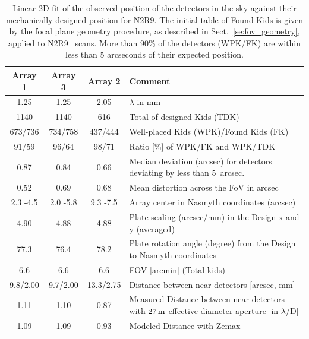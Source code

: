 \begin{table}[ht]
\label{ta:gridmatch}
\begin{center}
\begin{tabular}{|c|c|c|l|}
\hline
Array 1  &	Array 3   &	Array 2   &	Comment \\
\hline
1.25     &      1.25      &     2.05     &     $\lambda$ in mm \\
1140 	 &      1140 	   &        616  &	Total of designed Kids (TDK) \\
673/736  &	734/758  &	437/444  &	Well-placed Kids (WPK)/Found Kids (FK) \\
91/59 	 &    96/64 	 &      98/71 	 & Ratio [\%] of WPK/FK and WPK/TDK \\
0.87 	 &     0.84 	  & 0.66     &	Median deviation (arcsec) for detectors deviating by less than 5~arcsec. \\
0.52 	 &     0.69 	 &        0.68 	 & Mean distortion across the FoV in arcsec \\
2.3 -4.5  &	2.0 -5.8  &	9.3 -7.5  &	Array center in Nasmyth coordinates (arcsec) \\
4.90  &	4.88  &	4.88  &	Plate scaling (arcsec/mm) in the Design x and y (averaged) \\
77.3  &	76.4  &	78.2  &	Plate rotation angle (degree) from the Design to Nasmyth coordinates \\
6.6  &	6.6  &	6.6  &	FOV [arcmin] (Total kids) \\
9.8/2.00  &	9.7/2.00  &	13.3/2.75  &	Distance between near detectors [arcsec, mm] \\
1.11  &	1.10  &	0.87  &	Measured Distance between near detectors with $27\,\rm{m}$ effective diameter aperture [in $\lambda$/D] \\
1.09  & 1.09  & 0.93  & Modeled Distance with Zemax\\
\hline
\end{tabular}
\end{center}
\caption[Field-of-view deformations]{Linear 2D fit of the observed
  position of the detectors in the sky against their mechanically
  designed position for N2R9. The initial table of Found Kids is given
  by the focal plane geometry procedure, as described in
  Sect.~\ref{se:fov_geometry},
  applied to N2R9 \bm\ scans. More than 90\% of the detectors (WPK/FK) are
  within less than 5 arcseconds of their expected position. }
\end{table}

